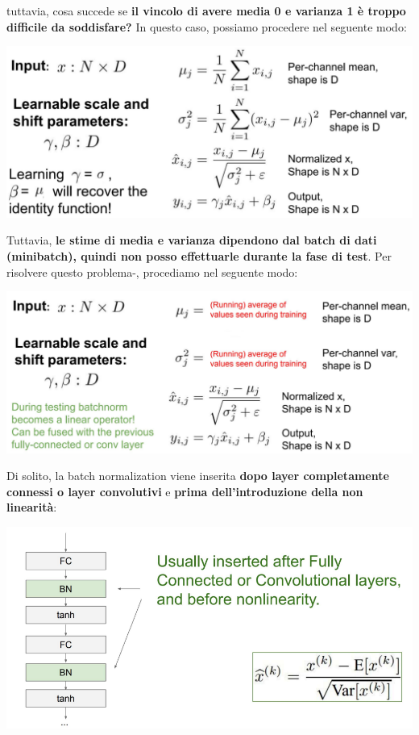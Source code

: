 \documentclass[12pt]{article}
\begin{document}
tuttavia, cosa succede se \textbf{il vincolo di avere media 0 e varianza 1 è troppo difficile da soddisfare?} In questo caso, possiamo procedere nel seguente modo:
\begin{center}
    \includegraphics[width =0.90\linewidth]{Images/140.PNG}
\end{center}
Tuttavia, \textbf{le stime di media e varianza dipendono dal batch di dati (minibatch), quindi non posso effettuarle durante la fase di test}.
Per risolvere questo problema-, procediamo nel seguente modo:
\begin{center}
    \includegraphics[width =0.90\linewidth]{Images/141.PNG}
\end{center}
Di solito, la batch normalization viene inserita \textbf{dopo layer completamente connessi o layer convolutivi} e \textbf{prima dell'introduzione della non linearità}:
\begin{center}
    \includegraphics[width =0.90\linewidth]{Images/142.PNG}
\end{center}
\end{document}

